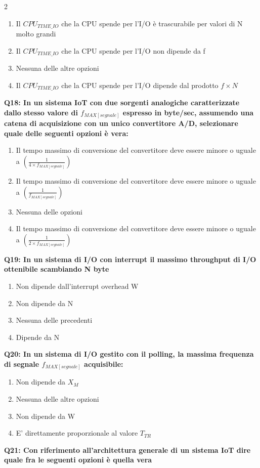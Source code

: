 \documentclass[10pt]{article}
\begin{document}
\begin{multicols}{2}
\begin{enumerate}[label=\arabic*.]
\item Il $CPU_{TIME\_IO}$ che la CPU spende per l’I/O è trascurabile per valori di N molto grandi
\item Il $CPU_{TIME\_IO}$ che la CPU spende per l’I/O non dipende da f
\item Nessuna delle altre opzioni
\item Il $CPU_{TIME\_IO}$ che la CPU spende per l’I/O dipende dal prodotto $f \times N$
\end{enumerate}
\textbf{Q18: In un sistema IoT con due sorgenti analogiche caratterizzate dallo stesso valore di $f_{MAX[segnale]}$ espresso in byte/sec, assumendo una catena di acquisizione con un unico convertitore A/D, selezionare quale delle seguenti opzioni è vera:}

\begin{enumerate}[label=\arabic*.]
\item Il tempo massimo di conversione del convertitore deve essere minore o uguale a $(\frac{1}{4 \times f_{MAX[segnale]}})$
\item Il tempo massimo di conversione del convertitore deve essere minore o uguale a $(\frac{1}{f_{MAX[segnale]}})$
\item Nessuna delle opzioni
\item Il tempo massimo di conversione del convertitore deve essere minore o uguale a $(\frac{1}{2 \times f_{MAX[segnale]}})$
\end{enumerate}
\textbf{Q19: In un sistema di I/O con interrupt il massimo throughput di I/O ottenibile scambiando N byte}

\begin{enumerate}[label=\arabic*.]
\item Non dipende dall’interrupt overhead W
\item Non dipende da N
\item Nessuna delle precedenti
\item Dipende da N
\end{enumerate}
\textbf{Q20: In un sistema di I/O gestito con il polling, la massima frequenza di segnale $f_{MAX[segnale]}$ acquisibile:}

\begin{enumerate}[label=\arabic*.]
\item Non dipende da $X_M$
\item Nessuna delle altre opzioni
\item Non dipende da W
\item E' direttamente proporzionale al valore $T_{TR}$
\end{enumerate}
\textbf{Q21: Con riferimento all’architettura generale di un sistema IoT dire quale fra le seguenti opzioni è quella vera}


\end{multicols}
\end{document}
